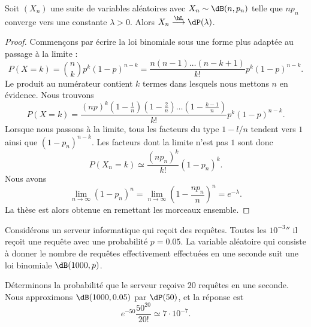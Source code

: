 \begin{proposition}
	Soit \( (X_n)\) une suite de variables aléatoires avec \( X_n\sim\dB(n,p_n)\) telle que \( np_n\) converge vers une constante \( \lambda>0\). Alors \( X_n\stackrel{\hL}{\longrightarrow}\dP(\lambda)\).
\end{proposition}

\begin{proof}
	Commençons par écrire la loi binomiale sous une forme plus adaptée au passage à la limite :
	\begin{equation}
		P(X=k)={n\choose k}p^k(1-p)^{n-k}=\frac{ n(n-1)\ldots (n-k+1) }{ k! }p^k(1-p)^{n-k}.
	\end{equation}
	Le produit au numérateur contient \( k\) termes dans lesquels nous mettons \( n\) en évidence. Nous trouvons
	\begin{equation}
		P(X=k)=\frac{ (np)^k\left( 1-\frac{1}{ n } \right)\left( 1-\frac{ 2 }{ n } \right)\ldots\left( 1-\frac{ k-1 }{ n } \right) }{ k! }p^k(1-p)^{n-k}.
	\end{equation}
	Lorsque nous passons à la limite, tous les facteurs du type \( 1-l/n\) tendent vers \( 1\) ainsi que \( (1-p_n)^{n-k}\). Les facteurs dont la limite n'est pas \( 1\) sont donc
	\begin{equation}
		P(X_n=k)\simeq\frac{ (np_n)^k }{ k! }(1-p_n)^k.
	\end{equation}
	Nous avons
	\begin{equation}
		\lim_{n\to \infty} (1-p_n)^n=\lim_{n\to \infty} \left( 1-\frac{ np_n }{ n } \right)^n= e^{-\lambda}.
	\end{equation}
	La thèse est alors obtenue en remettant les morceaux ensemble.
\end{proof}

\begin{example}
	Considérons un serveur informatique qui reçoit des requêtes. Toutes les \( \unit{10^{-3}}{\second}\) il reçoit une requête avec une probabilité \( p=0.05\). La variable aléatoire qui consiste à donner le nombre de requêtes effectivement effectuées en une seconde suit une loi binomiale \( \dB(1000,p)\).

	Déterminons la probabilité que le serveur reçoive \( 20\) requêtes en une seconde. Nous approximons \( \dB(1000,0.05)\) par \( \dP(50)\), et la réponse est
	\begin{equation}
		e^{-50}\frac{ 50^{20} }{ 20! }\simeq 7\cdot 10^{-7}.
	\end{equation}
\end{example}

